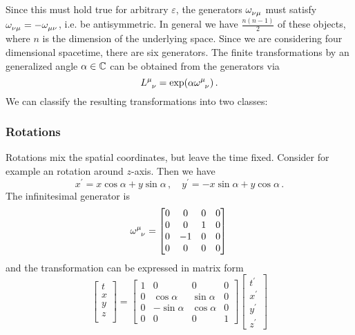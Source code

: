 Since this must hold true for arbitrary $\varepsilon$, the generators
$\tensor{\omega}{_\nu_\mu}$ must satisfy
$\tensor{\omega}{_\nu_\mu}=-\tensor{\omega}{_\mu_\nu}$, i.e. be antisymmetric.
In general we have $\frac{n(n-1)}{2}$ of these objects, where $n$ is the
dimension of the underlying space.
Since we are considering four dimensional spacetime, there are six generators.
The finite transformations by an generalized angle $\alpha\in\mathbb{C}$ can be
obtained from the generators via
\begin{equation}
    \tensor{L}{^\mu_\nu}=\exp\left(\alpha\tensor{\omega}{^\mu_\nu}\right)\,.
\end{equation}
We can
classify the resulting transformations into two classes:
\subsubsection{Rotations}
Rotations mix the spatial coordinates, but leave the time fixed. Consider for
example an rotation around $z$-axis. Then we have
\begin{equation}
    x^\prime=x\cos\alpha+y\sin\alpha \, ,\quad y^\prime=-x\sin\alpha+y\cos\alpha \, .
\end{equation}
The infinitesimal generator is
\begin{equation}
    \tensor{\omega}{^\mu_\nu}
    =
    \begin{bmatrix}
        0&0 & 0&0\\
        0&0 &1&0\\
        0&-1&0 &0\\
        0&0 &0 &0
    \end{bmatrix}\,
\end{equation}
and the transformation can be expressed in matrix form
\begin{equation}
    \begin{bmatrix}
        t\\
        x\\
        y\\
        z\\
    \end{bmatrix}=
    \begin{bmatrix}
        1&0 & 0&0\\
        0&\cos\alpha &\sin\alpha&0\\
        0&-\sin\alpha&\cos\alpha &0\\
        0&0 &0 &1
    \end{bmatrix}
    \begin{bmatrix}
        t^\prime\\
        x^\prime\\
        y^\prime\\
        z^\prime
    \end{bmatrix}
\end{equation}
